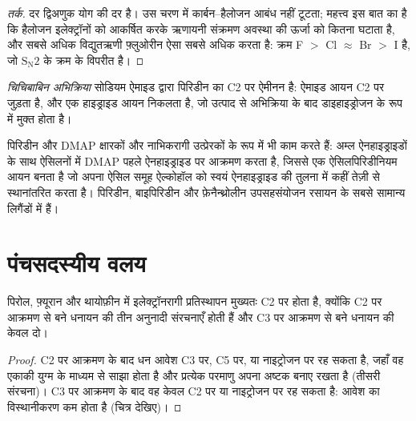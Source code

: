 \begin{proof}[तर्क]
दर द्विअणुक योग की दर है। उस चरण में कार्बन--हैलोजन आबंध नहीं
टूटता; महत्त्व इस बात का है कि हैलोजन इलेक्ट्रॉनों को आकर्षित करके ऋणायनी संक्रमण अवस्था
की ऊर्जा को कितना घटाता है, और सबसे अधिक विद्युतऋणी फ़्लुओरीन ऐसा सबसे अधिक
करता है: क्रम F $>$ Cl $\approx$ Br $>$ I है, जो $\mathrm S_\mathrm N2$ के क्रम के विपरीत है।
\end{proof}

\begin{definition}[चिचिबाबिन अभिक्रिया]\label{def:b3:heterocycles:chichibabin}
\emph{चिचिबाबिन अभिक्रिया} सोडियम ऐमाइड द्वारा पिरिडीन का
C2 पर ऐमीनन है: ऐमाइड आयन C2 पर जुड़ता है, और एक हाइड्राइड आयन निकलता है, जो
उत्पाद से अभिक्रिया के बाद डाइहाइड्रोजन के रूप में मुक्त होता है।
\end{definition}

पिरिडीन और DMAP क्षारकों और नाभिकरागी उत्प्रेरकों के रूप में भी काम करते हैं: अम्ल
ऐनहाइड्राइडों के साथ ऐसिलनों में DMAP पहले ऐनहाइड्राइड पर आक्रमण करता है, जिससे एक
ऐसिलपिरिडीनियम आयन बनता है जो अपना ऐसिल समूह ऐल्कोहॉल को स्वयं
ऐनहाइड्राइड की तुलना में कहीं तेज़ी से स्थानांतरित करता है। पिरिडीन, बाइपिरिडीन और फ़ेनैन्थ्रोलीन
उपसहसंयोजन रसायन के सबसे सामान्य लिगैंडों में हैं।

\section{पंचसदस्यीय वलय}

\begin{proposition}[C2 पर पिरोल का इलेक्ट्रॉनरागी प्रतिस्थापन]\label{prop:b3:heterocycles:pyrrole-c2}
पिरोल, फ़्यूरान और थायोफ़ीन में इलेक्ट्रॉनरागी प्रतिस्थापन मुख्यतः C2 पर होता है,
क्योंकि C2 पर आक्रमण से बने धनायन की तीन अनुनादी संरचनाएँ होती हैं और C3 पर
आक्रमण से बने धनायन की केवल दो।
\end{proposition}

\begin{proof}
C2 पर आक्रमण के बाद धन आवेश C3 पर, C5 पर, या नाइट्रोजन पर रह सकता है,
जहाँ वह एकाकी युग्म के माध्यम से साझा होता है और प्रत्येक परमाणु अपना अष्टक बनाए रखता है (तीसरी
संरचना)। C3 पर आक्रमण के बाद वह केवल C2 पर या नाइट्रोजन पर रह सकता है: आवेश
का विस्थानीकरण कम होता है (चित्र देखिए)।
\end{proof}

